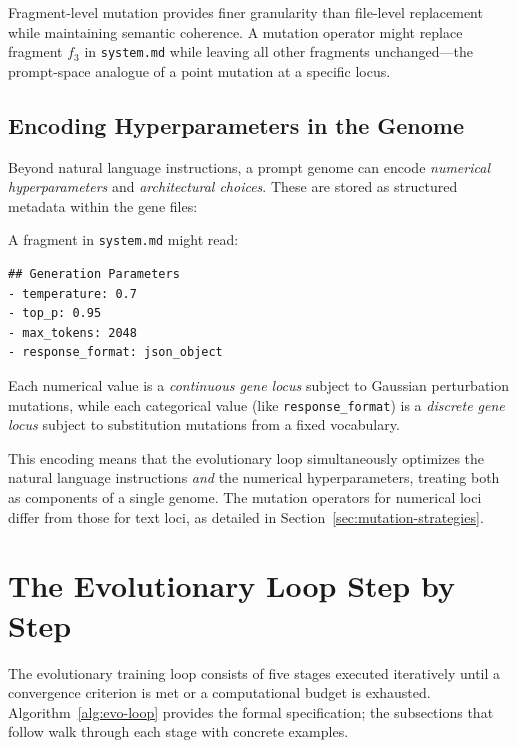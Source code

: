 Fragment-level mutation provides finer granularity than file-level replacement while maintaining semantic coherence. A mutation operator might replace fragment $f_3$ in \texttt{system.md} while leaving all other fragments unchanged---the prompt-space analogue of a point mutation at a specific locus.

\subsection{Encoding Hyperparameters in the Genome}

Beyond natural language instructions, a prompt genome can encode \emph{numerical hyperparameters} and \emph{architectural choices}. These are stored as structured metadata within the gene files:

\begin{example}
A fragment in \texttt{system.md} might read:
\begin{verbatim}
## Generation Parameters
- temperature: 0.7
- top_p: 0.95
- max_tokens: 2048
- response_format: json_object
\end{verbatim}
Each numerical value is a \emph{continuous gene locus} subject to Gaussian perturbation mutations, while each categorical value (like \texttt{response\_format}) is a \emph{discrete gene locus} subject to substitution mutations from a fixed vocabulary.
\end{example}

This encoding means that the evolutionary loop simultaneously optimizes the natural language instructions \emph{and} the numerical hyperparameters, treating both as components of a single genome. The mutation operators for numerical loci differ from those for text loci, as detailed in Section~\ref{sec:mutation-strategies}.

\section{The Evolutionary Loop Step by Step}
\label{sec:five-stages}

The evolutionary training loop consists of five stages executed iteratively until a convergence criterion is met or a computational budget is exhausted. Algorithm~\ref{alg:evo-loop} provides the formal specification; the subsections that follow walk through each stage with concrete examples.

